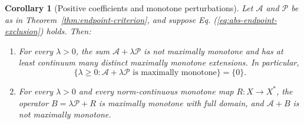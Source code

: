 \documentclass[11pt]{article}
\newtheorem{corollary}{Corollary}
\theoremstyle{definition}
\theoremstyle{remark}
\begin{document}
\begin{corollary}[Positive coefficients and monotone perturbations]
\label{cor:positive-perturbations}
Let $\mathcal A$ and $\mathcal P$ be as in Theorem~\ref{thm:endpoint-criterion}, and suppose Eq. (\ref{eq:abs-endpoint-exclusion}) holds. Then:
\begin{enumerate}
\item For every $\lambda>0$, the sum $\mathcal A+\lambda\mathcal P$ is not maximally monotone and has at least continuum many distinct maximally monotone extensions. In particular,
\[
\{\lambda\ge0:\mathcal A+\lambda\mathcal P\text{ is maximally monotone}\}=\{0\}.
\]
\item For every $\lambda>0$ and every norm-continuous monotone map $R:X\to X^*$, the operator $B=\lambda\mathcal P+R$ is maximally monotone with full domain, and $\mathcal A+B$ is not maximally monotone.
\end{enumerate}
\end{corollary}
\end{document}
